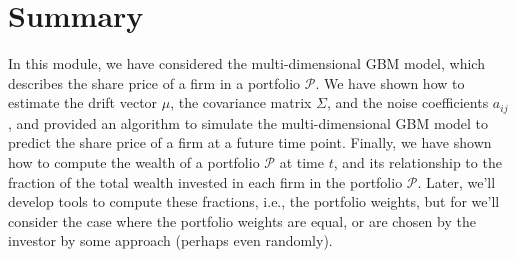 \documentclass[11pt]{article}
\theoremstyle{definition}
\begin{document}
\section*{Summary}
In this module, we have considered the multi-dimensional GBM model, 
which describes the share price of a firm in a portfolio $\mathcal{P}$.
We have shown how to estimate the drift vector $\mu$, the covariance matrix $\Sigma$, and the noise coefficients $a_{ij}$,
and provided an algorithm to simulate the multi-dimensional GBM model to predict the share price of a firm at a future time point.
Finally, we have shown how to compute the wealth of a portfolio $\mathcal{P}$ at time $t$, and its relationship 
to the fraction of the total wealth invested in each firm in the portfolio $\mathcal{P}$.
Later, we'll develop tools to compute these fractions, i.e., the portfolio weights, 
but for we'll consider the case where the portfolio weights are equal, or are chosen by the investor by some approach
(perhaps even randomly).



\clearpage
\printindex
\end{document}
